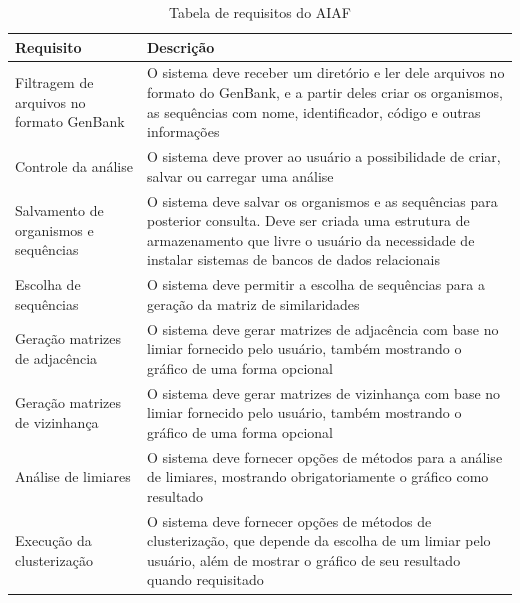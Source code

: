 \begin{table}
\centering
\caption{Tabela de requisitos do AIAF} %
\begin{tabular}{p{5cm}p{10cm}} %
\hline 
Requisito & Descrição \\ 
\hline
\hline
Filtragem de arquivos no formato GenBank & O sistema deve receber um diretório e ler dele arquivos no formato do GenBank, e a partir deles criar os
organismos, as sequências com nome, identificador, código e outras informações\\ \hline
Controle da análise & O sistema deve prover ao usuário a possibilidade de criar, salvar ou carregar uma análise \\ \hline
Salvamento de organismos e sequências & O sistema deve salvar os organismos e as sequências para posterior consulta. Deve ser criada uma estrutura de
armazenamento que livre o usuário da necessidade de instalar sistemas de bancos de dados relacionais \\ \hline
Escolha de sequências & O sistema deve permitir a escolha de sequências para a geração da matriz de similaridades \\ \hline
Geração matrizes de adjacência & O sistema deve gerar matrizes de adjacência com base no limiar fornecido pelo usuário, também mostrando o gráfico de uma
forma opcional \\ \hline
Geração matrizes de vizinhança & O sistema deve gerar matrizes de vizinhança com base no limiar fornecido pelo usuário, também mostrando o gráfico de uma
forma opcional \\ \hline
Análise de limiares & O sistema deve fornecer opções de métodos para a análise de limiares, mostrando obrigatoriamente o gráfico como resultado\\ \hline
Execução da clusterização & O sistema deve fornecer opções de métodos de clusterização, que depende da escolha de um limiar pelo usuário, além de mostrar
o gráfico de seu resultado quando requisitado \\ \hline

\end{tabular}
\end{table}
